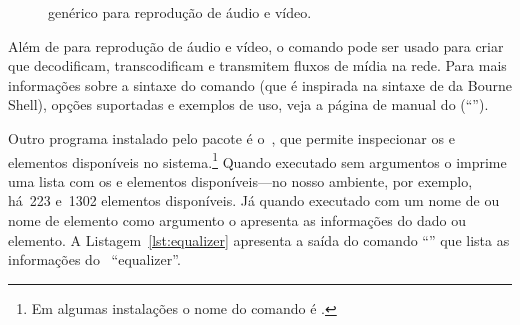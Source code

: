 \documentclass{SBCbookchapter}
\begin{document}
\begin{figure}[H]
  \centering
  \caption{ genérico para reprodução de áudio e vídeo.}
  \label{fig:pipe-gen}
\end{figure}

Além de  para reprodução de áudio e vídeo, o comando
 pode ser usado para criar  que decodificam,
transcodificam e transmitem fluxos de mídia na rede.  Para mais informações
sobre a sintaxe do comando (que é inspirada na sintaxe de  da
Bourne Shell), opções suportadas e exemplos de uso, veja a página de manual
do  (``'').

Outro programa instalado pelo pacote  é o~,
que permite inspecionar os  e elementos disponíveis no
sistema.\footnote{Em algumas instalações o nome do comando é
  .}  Quando executado sem argumentos o 
imprime uma lista com os  e elementos disponíveis---no nosso
ambiente, por exemplo, há~223  e~1302 elementos disponíveis.  Já
quando executado com um nome de  ou nome de elemento como
argumento o  apresenta as informações do dado  ou
elemento.  A Listagem~\ref{lst:equalizer} apresenta a saída do comando
``'' que lista as informações do
~``equalizer''.
\end{document}
